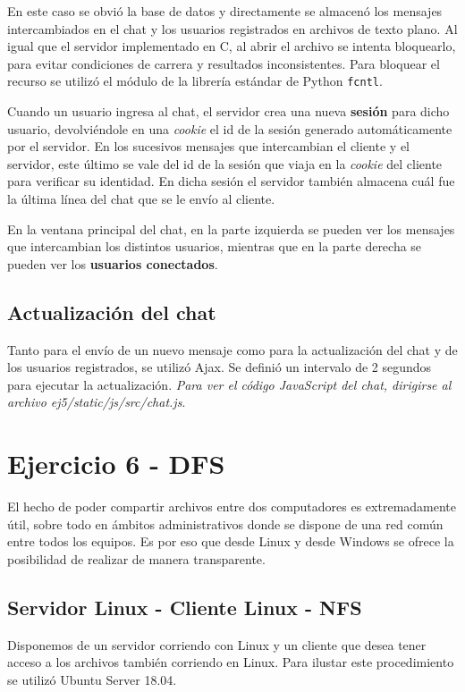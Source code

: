 En este caso se obvió la base de datos y directamente se almacenó los mensajes intercambiados en el chat y los usuarios registrados en archivos de texto plano. Al igual que el servidor implementado en C, al abrir el archivo se intenta bloquearlo, para evitar condiciones de carrera y resultados inconsistentes. Para bloquear el recurso se utilizó el módulo de la librería estándar de Python \texttt{fcntl}. 

Cuando un usuario ingresa al chat, el servidor crea una nueva \textbf{sesión} para dicho usuario, devolviéndole en una \emph{cookie} el id de la sesión generado automáticamente por el servidor. En los sucesivos mensajes que intercambian el cliente y el servidor, este último se vale del id de la sesión que viaja en la \emph{cookie} del cliente para verificar su identidad. En dicha sesión el servidor también almacena cuál fue la última línea del chat que se le envío al cliente.

En la ventana principal del chat, en la parte izquierda se pueden ver los mensajes que intercambian los distintos usuarios, mientras que en la parte derecha se pueden ver los \textbf{usuarios conectados}. 

\subsection{Actualización del chat}

Tanto para el envío de un nuevo mensaje como para la actualización del chat y de los usuarios registrados, se utilizó Ajax. Se definió un intervalo de 2 segundos para ejecutar la actualización. \emph{Para ver el código JavaScript del chat, dirigirse al archivo ej5/static/js/src/chat.js}.


\section{Ejercicio 6 - DFS}

El hecho de poder compartir archivos entre dos computadores es extremadamente útil, sobre todo en ámbitos administrativos donde se dispone de una red común entre todos los equipos. Es por eso que desde Linux y desde Windows se ofrece la posibilidad de realizar de manera transparente.

\subsection{Servidor Linux - Cliente Linux - NFS}

Disponemos de un servidor corriendo con Linux y un cliente que desea tener acceso a los archivos también corriendo en Linux. Para ilustar este procedimiento se utilizó Ubuntu Server 18.04.

